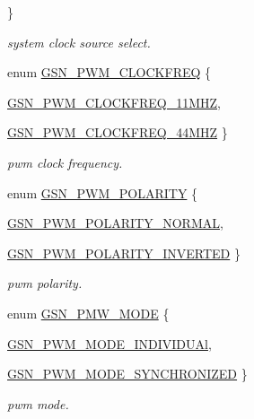 \begin{DoxyCompactItemize}
 \}
\begin{DoxyCompactList}\small\item\em system clock source select. \end{DoxyCompactList}\item 
enum \hyperlink{a00650_ga52371d0feb719879e34584cfa2ef6733}{GSN\_\-PWM\_\-CLOCKFREQ} \{ \par
\hyperlink{a00650_gga52371d0feb719879e34584cfa2ef6733af5206b3c38acc666f31b9e983a15a976}{GSN\_\-PWM\_\-CLOCKFREQ\_\-11MHZ}, 
\par
\hyperlink{a00650_gga52371d0feb719879e34584cfa2ef6733abfabf3386290830ba5535eaeec958549}{GSN\_\-PWM\_\-CLOCKFREQ\_\-44MHZ}
 \}
\begin{DoxyCompactList}\small\item\em pwm clock frequency. \end{DoxyCompactList}\item 
enum \hyperlink{a00650_gaea0350ae8992c56b4a1bad6bc7ad5de1}{GSN\_\-PWM\_\-POLARITY} \{ \par
\hyperlink{a00650_ggaea0350ae8992c56b4a1bad6bc7ad5de1a52b06fef71cae3aec176796d4c9b1ac5}{GSN\_\-PWM\_\-POLARITY\_\-NORMAL}, 
\par
\hyperlink{a00650_ggaea0350ae8992c56b4a1bad6bc7ad5de1a585764d58b3de6209961d2b9787d26dd}{GSN\_\-PWM\_\-POLARITY\_\-INVERTED}
 \}
\begin{DoxyCompactList}\small\item\em pwm polarity. \end{DoxyCompactList}\item 
enum \hyperlink{a00650_ga2ce321cf068e815e8a30642d73f1bdd4}{GSN\_\-PMW\_\-MODE} \{ \par
\hyperlink{a00650_gga2ce321cf068e815e8a30642d73f1bdd4a53c59d2f203c604754f20a6b7ec71555}{GSN\_\-PWM\_\-MODE\_\-INDIVIDUAl}, 
\par
\hyperlink{a00650_gga2ce321cf068e815e8a30642d73f1bdd4a7a23dfc92d04b1e2f8fc60ea8579453b}{GSN\_\-PWM\_\-MODE\_\-SYNCHRONIZED}
 \}
\begin{DoxyCompactList}\small\item\em pwm mode. \end{DoxyCompactList}\end{DoxyCompactItemize}
